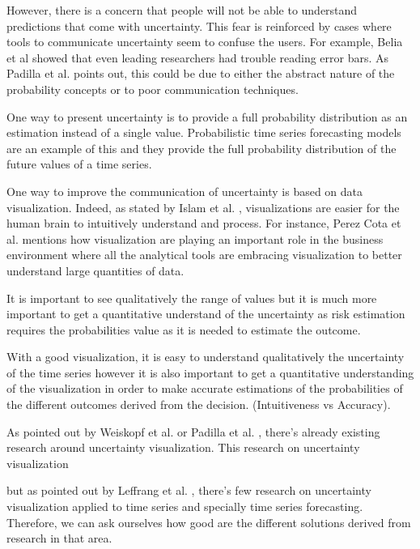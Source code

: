 \documentclass[a4paper,3p,sort&compress]{elsarticle}
\begin{document}
However, there is a concern that people will not be able to understand predictions that come with uncertainty.
This fear is reinforced by cases where tools to communicate uncertainty seem to confuse the users. For example,
Belia et al \cite{belia_researchers_2005} showed that even leading researchers had 
trouble reading error bars. 
As Padilla et al. \cite{padilla_uncertainty_2021} 
points out, this could be due to either the abstract nature of the probability concepts or to poor communication techniques.

One way to present 
uncertainty is to provide a full probability distribution as an estimation instead of a single value. 
Probabilistic time series forecasting models are an example of this and they provide the full probability 
distribution of the future values of a time series.

One way to improve the communication of uncertainty is based on data visualization. Indeed, as 
stated by Islam et al. \cite{islam_overview_2019}, visualizations are easier for the human brain to intuitively understand and process.
For instance, Perez Cota et al. \cite{cota_importance_2014} mentions how visualization are playing an important role in the business 
environment where all the analytical tools are embracing visualization to better understand large quantities of data. 

It is important to see qualitatively the range of values but it is much more important to get a quantitative understand of the uncertainty
as risk estimation requires the probabilities value 
as it is needed to estimate the outcome.

With a good visualization, it is easy to understand qualitatively the uncertainty of the time series however it is also important to get a 
quantitative understanding of the visualization in order to make accurate estimations of the probabilities of the different outcomes 
derived from the decision. (Intuitiveness vs Accuracy).

As pointed out by Weiskopf et al. \cite{weiskopf_uncertainty_2022} or Padilla et al. \cite{padilla_uncertainty_2021}, 
there's already existing research around uncertainty visualization. This research on uncertainty visualization


but as pointed out by Leffrang et al. \cite{leffrang_should_2021}, there's few research on uncertainty visualization applied to time series 
and specially time series forecasting. Therefore, we can ask ourselves how good are the different solutions derived from research in that area. 
\end{document}
